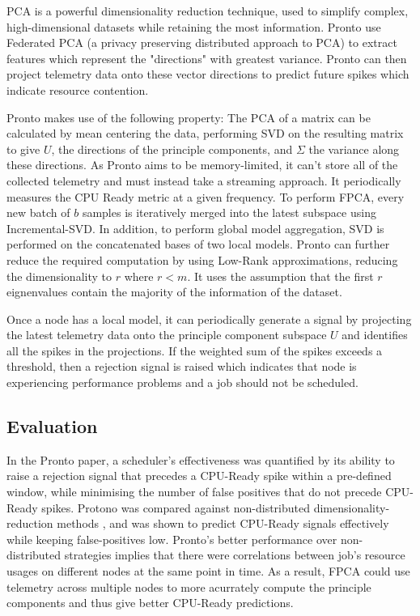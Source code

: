 PCA is a powerful dimensionality reduction technique, used to simplify
complex, high-dimensional datasets while retaining the most information. Pronto
use Federated PCA (a privacy preserving distributed approach to PCA) to extract
features which represent the "directions" with greatest variance. Pronto can
then project telemetry data onto these vector directions to predict future
spikes which indicate resource contention.

Pronto makes use of the following property: The PCA of a matrix can be
calculated by mean centering the data, performing SVD on the resulting matrix to
give $U$, the directions of the principle components, and $\Sigma$ the variance
along these directions. As Pronto aims to be memory-limited, it can't store all
of the collected telemetry and must instead take a streaming approach. It
periodically measures the CPU Ready metric at a given frequency. To perform
FPCA, every new batch of $b$ samples is iteratively merged into the latest
subspace using Incremental-SVD. In addition, to perform global model
aggregation, SVD is performed on the concatenated bases of two local models.
Pronto can further reduce the required computation by using Low-Rank
approximations, reducing the dimensionality to $r$ where $r < m$. It uses the
assumption that the first $r$ eignenvalues contain the majority of the
information of the dataset.

Once a node has a local model, it can periodically generate a signal by
projecting the latest telemetry data onto the principle component subspace $U$
and identifies all the spikes in the projections. If the weighted sum of the
spikes exceeds a threshold, then a rejection signal is raised which indicates
that node is experiencing performance problems and a job should not be
scheduled.

\subsection{Evaluation}

In the Pronto paper, a scheduler's effectiveness was quantified by its ability
to raise a rejection signal that precedes a CPU-Ready spike within a pre-defined
window, while minimising the number of false positives that do not precede
CPU-Ready spikes. Protono was compared against non-distributed
dimensionality-reduction methods \cite{}, and was shown to predict CPU-Ready
signals effectively while keeping false-positives low. Pronto's better
performance over non-distributed strategies implies that there were correlations
between job's resource usages on different nodes at the same point in time. As a
result, FPCA could use telemetry across multiple nodes to more acurrately
compute the principle components and thus give better CPU-Ready predictions.

